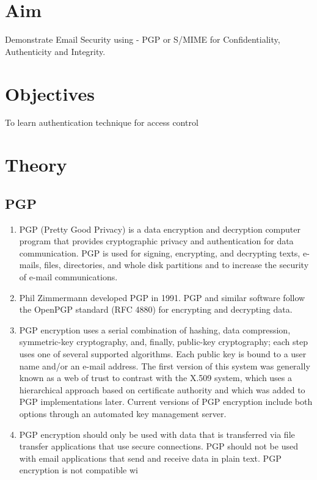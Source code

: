 \documentclass[11pt]{article}
\begin{document}
\tableofcontents
\thispagestyle{empty}
\clearpage

\setcounter{page}{1}

\section{Aim}
Demonstrate Email Security using - PGP or S/MIME for Confidentiality, Authenticity and Integrity.

\section{Objectives}
To learn authentication technique for access control

\section{Theory}

\subsection{PGP}

\begin{enumerate}
    \item PGP (Pretty Good Privacy) is a data encryption and decryption computer program that provides cryptographic privacy and authentication for data communication. PGP is used for signing, encrypting, and decrypting texts, e-mails, files, directories, and whole disk partitions and to increase the security of e-mail communications.
    \item Phil Zimmermann developed PGP in 1991. PGP and similar software follow the OpenPGP standard (RFC 4880) for encrypting and decrypting data.
    \item PGP encryption uses a serial combination of hashing, data compression, symmetric-key cryptography, and, finally, public-key cryptography; each step uses one of several supported algorithms. Each public key is bound to a user name and/or an e-mail address. The first version of this system was generally known as a web of trust to contrast with the X.509 system, which uses a hierarchical approach based on certificate authority and which was added to PGP implementations later. Current versions of PGP encryption include both options through an automated key management server.
    \item PGP encryption should only be used with data that is transferred via file transfer applications that use secure connections. PGP should not be used with email applications that send and receive data in plain text. PGP encryption is not compatible wi    
\end{enumerate}
\end{document}
